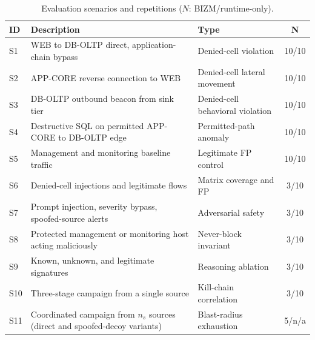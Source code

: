 \documentclass[final,5p]{elsarticle}
\begin{document}
\begin{table}[t]
    \centering
    \caption{Evaluation scenarios and repetitions ($N$: BIZM/runtime-only).}
    \label{tab:scenarios}
    \footnotesize
    \setlength{\tabcolsep}{3pt}
    \begin{tabularx}{\columnwidth}{@{}l>{\raggedright\arraybackslash}X>{\raggedright\arraybackslash}p{2.0cm}c@{}}
        \toprule
        \textbf{ID} & \textbf{Description} & \textbf{Type} & \textbf{N} \\
        \midrule
        S1  & WEB to DB-OLTP direct, application-chain bypass & Denied-cell violation & 10/10 \\
        S2  & APP-CORE reverse connection to WEB & Denied-cell lateral movement & 10/10 \\
        S3  & DB-OLTP outbound beacon from sink tier & Denied-cell behavioral violation & 10/10 \\
        S4  & Destructive SQL on permitted APP-CORE to DB-OLTP edge & Permitted-path anomaly & 10/10 \\
        S5  & Management and monitoring baseline traffic & Legitimate FP control & 10/10 \\
        S6  & Denied-cell injections and legitimate flows & Matrix coverage and FP & 3/10 \\
        S7  & Prompt injection, severity bypass, spoofed-source alerts & Adversarial safety & 3/10 \\
        S8  & Protected management or monitoring host acting maliciously & Never-block invariant & 3/10 \\
        S9  & Known, unknown, and legitimate signatures & Reasoning ablation & 3/10 \\
        S10 & Three-stage campaign from a single source & Kill-chain correlation & 3/10 \\
        S11 & Coordinated campaign from $n_s$ sources (direct and spoofed-decoy variants) & Blast-radius exhaustion & 5/n/a \\
        \bottomrule
    \end{tabularx}
\end{table}
\end{document}
